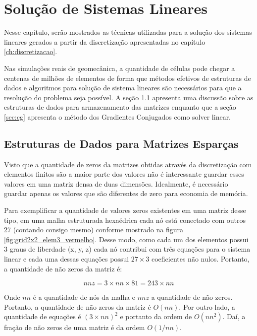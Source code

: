 \chapter{Solução de Sistemas Lineares}

Nesse capítulo, serão mostrados as técnicas utilizadas para a solução dos sistemas lineares gerados a partir da discretização apresentadas no capítulo \ref{ch:discretizacao}.


Nas simulações reais de geomecânica, a quantidade de células pode chegar a centenas de milhões de elementos de forma que métodos efetivos de estruturas de dados e algoritmos para solução de sistema lineares são necessários para que a resolução do problema seja possível. A seção \ref{sec:csr} apresenta uma discussão sobre as estruturas de dados para armazenamento das matrizes enquanto que a seção \ref{sec:cg} apresenta o método dos Gradientes Conjugados como solver linear.


\section{Estruturas de Dados para Matrizes Esparças} \label{sec:csr}


Visto que a quantidade de zeros da matrizes obtidas através da discretização com elementos finitos são a maior parte dos valores não é interessante guardar esses valores em uma matriz densa de duas dimensões. Idealmente, é necessário guardar apenas os valores que são diferentes de zero para economia de memória.

Para exemplificar a quantidade de valores zeros existentes em uma matriz desse tipo, em uma malha estruturada hexaédrica cada nó está conectado com outros 27 (contando consigo mesmo) conforme mostrado na figura \ref{fig:grid2x2_elem3_vermelho}. Desse modo, como cada um dos elementos possui 3 graus de liberdade (x, y, z) cada nó contribui com três equações para o sistema linear e cada uma dessas equações possui $27\times3$ coeficientes não nulos.
Portanto, a quantidade de não zeros da matriz é:

\begin{equation}
    nnz = 3 \times nn \times 81 = 243 \times nn
\end{equation}

Onde $nn$ é a quantidade de nós da malha e $nnz$ a quantidade de não zeros. Portanto, a quantidade de não zeros da matriz é $O(nn)$. Por outro lado, a quantidade de equações é $(3\times nn)^2 $ e portanto da ordem de $O(nn^2)$. Daí, a fração de não zeros de uma matriz é da ordem $O(1/nn)$.


